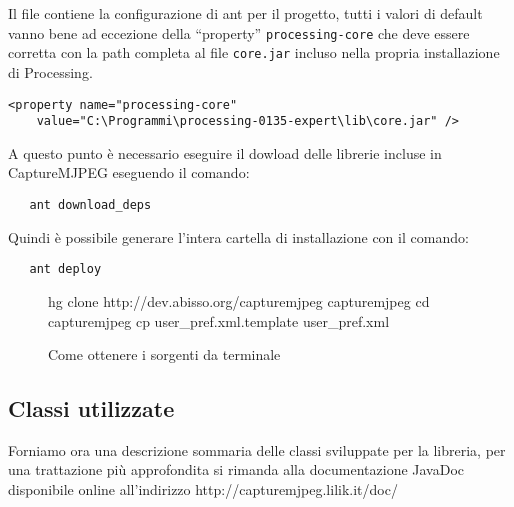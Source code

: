 \documentclass[a4paper,11pt]{article}
\begin{document}
Il file contiene la configurazione di ant per il progetto, tutti i
valori di default vanno bene ad eccezione della ``property''
\texttt{processing-core} che deve essere corretta con la path completa
al file \texttt{core.jar} incluso nella propria installazione di Processing.
\begin{verbatim}
<property name="processing-core" 
    value="C:\Programmi\processing-0135-expert\lib\core.jar" />
\end{verbatim}

A questo punto è necessario eseguire il dowload delle librerie incluse
in CaptureMJPEG eseguendo il comando:
\begin{verbatim}
   ant download_deps
\end{verbatim}

Quindi è possibile generare l'intera cartella di installazione con
il comando:
\begin{verbatim}
   ant deploy 
\end{verbatim}
\begin{figure}
  \centering
\begin{boxedverbatim}

 hg clone http://dev.abisso.org/capturemjpeg capturemjpeg   
 cd capturemjpeg
 cp user_pref.xml.template user_pref.xml

\end{boxedverbatim}  
  \caption{Come ottenere i sorgenti da terminale}
  \label{fig:clone}
\end{figure}

\subsection{Classi utilizzate}
\label{sec:classi}
Forniamo ora una descrizione sommaria delle classi sviluppate per la
libreria, per una trattazione più approfondita si rimanda alla
documentazione JavaDoc disponibile online all'indirizzo 
http://capturemjpeg.lilik.it/doc/
\end{document}
